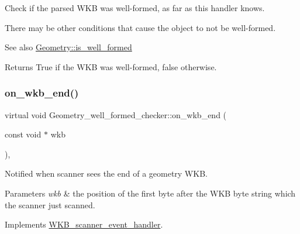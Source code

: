 Check if the parsed W\+KB was well-\/formed, as far as this handler knows.

There may be other conditions that cause the object to not be well-\/formed.

\begin{DoxySeeAlso}{See also}
\mbox{\hyperlink{classGeometry_ae034f775d692619cc4bc8842d34a4cd8}{Geometry\+::is\+\_\+well\+\_\+formed}}
\end{DoxySeeAlso}
\begin{DoxyReturn}{Returns}
True if the W\+KB was well-\/formed, false otherwise. 
\end{DoxyReturn}
\mbox{\label{classGeometry__well__formed__checker_a448bf937ff032ce46a3b2e69a4d0907e}} 
\subsubsection{\texorpdfstring{on\+\_\+wkb\+\_\+end()}{on\_wkb\_end()}}
{\footnotesize\ttfamily virtual void Geometry\+\_\+well\+\_\+formed\+\_\+checker\+::on\+\_\+wkb\+\_\+end (\begin{DoxyParamCaption}\item[{const void $\ast$}]{wkb }\end{DoxyParamCaption})\hspace{0.3cm}{\ttfamily [inline]}, {\ttfamily [virtual]}}

Notified when scanner sees the end of a geometry W\+KB. 
\begin{DoxyParams}{Parameters}
{\em wkb} & the position of the first byte after the W\+KB byte string which the scanner just scanned. \\
\hline
\end{DoxyParams}


Implements \mbox{\hyperlink{classWKB__scanner__event__handler_a07c27cceefdd31f25f1d0b3754786b78}{W\+K\+B\+\_\+scanner\+\_\+event\+\_\+handler}}.

\mbox{\label{classGeometry__well__formed__checker_a6ae74af00fe1297813f3c35ba58ff372}} 
